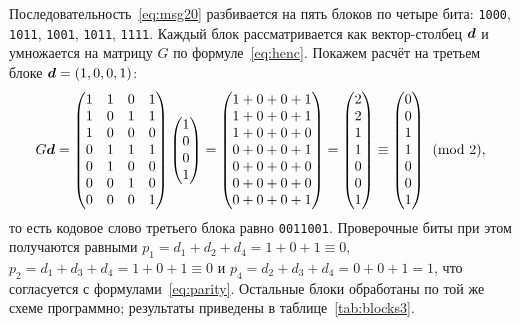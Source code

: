 \documentclass[a4paper,14pt]{extarticle}
\begin{document}
Последовательность~\eqref{eq:msg20} разбивается на пять блоков по четыре бита:
\texttt{1000}, \texttt{1011}, \texttt{1001}, \texttt{1011}, \texttt{1111}. Каждый блок
рассматривается как вектор-столбец $\boldsymbol{d}$ и умножается на матрицу $G$ по
формуле~\eqref{eq:henc}. Покажем расчёт на третьем блоке $\boldsymbol{d} = (1, 0, 0, 1)$:
\begin{equation}
  G\boldsymbol{d} =
  \begin{pmatrix} 1&1&0&1 \\ 1&0&1&1 \\ 1&0&0&0 \\ 0&1&1&1 \\ 0&1&0&0 \\ 0&0&1&0 \\ 0&0&0&1 \end{pmatrix}
  \begin{pmatrix} 1 \\ 0 \\ 0 \\ 1 \end{pmatrix}
  =
  \begin{pmatrix} 1+0+0+1 \\ 1+0+0+1 \\ 1+0+0+0 \\ 0+0+0+1 \\ 0+0+0+0 \\ 0+0+0+0 \\ 0+0+0+1 \end{pmatrix}
  =
  \begin{pmatrix} 2 \\ 2 \\ 1 \\ 1 \\ 0 \\ 0 \\ 1 \end{pmatrix}
  \equiv
  \begin{pmatrix} 0 \\ 0 \\ 1 \\ 1 \\ 0 \\ 0 \\ 1 \end{pmatrix} \pmod 2 ,
\end{equation}
то есть кодовое слово третьего блока равно \texttt{0011001}. Проверочные биты при этом
получаются равными $p_1 = d_1 + d_2 + d_4 = 1 + 0 + 1 \equiv 0$,
$p_2 = d_1 + d_3 + d_4 = 1 + 0 + 1 \equiv 0$ и
$p_4 = d_2 + d_3 + d_4 = 0 + 0 + 1 = 1$, что согласуется с
формулами~\eqref{eq:parity}. Остальные блоки обработаны по той же схеме программно;
результаты приведены в таблице~\ref{tab:blocks3}.
\end{document}

